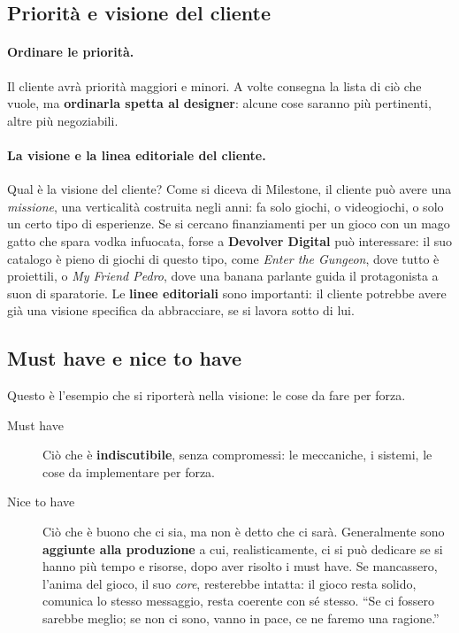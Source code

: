 \subsection{Priorità e visione del cliente}

\paragraph{Ordinare le priorità.} Il cliente avrà priorità maggiori e
minori. A volte consegna la lista di ciò che vuole, ma \textbf{ordinarla spetta
al designer}: alcune cose saranno più pertinenti, altre più negoziabili.

\paragraph{La visione e la linea editoriale del cliente.} Qual è la visione
del cliente? Come si diceva di Milestone, il cliente può avere una
\emph{missione}, una verticalità costruita negli anni: fa solo giochi, o
videogiochi, o solo un certo tipo di esperienze. Se si cercano finanziamenti
per un gioco con un mago gatto che spara vodka infuocata, forse a
\textbf{Devolver Digital} può interessare: il suo catalogo è pieno di giochi
di questo tipo, come \emph{Enter the Gungeon}, dove tutto è proiettili, o
\emph{My Friend Pedro}, dove una banana parlante guida il protagonista a
suon di sparatorie. Le \textbf{linee editoriali} sono importanti: il cliente
potrebbe avere già una visione specifica da abbracciare, se si lavora sotto di
lui.

\subsection{Must have e nice to have}

Questo è l'esempio che si riporterà nella visione: le cose da fare per forza.
\begin{description}
  \item[Must have] Ciò che è \textbf{indiscutibile}, senza compromessi: le
        meccaniche, i sistemi, le cose da implementare per forza.
  \item[Nice to have] Ciò che è buono che ci sia, ma non è detto che ci sarà.
        Generalmente sono \textbf{aggiunte alla produzione} a cui,
        realisticamente, ci si può dedicare se si hanno più tempo e risorse,
        dopo aver risolto i must have. Se mancassero, l'anima del gioco, il suo
        \emph{core}, resterebbe intatta: il gioco resta solido, comunica lo
        stesso messaggio, resta coerente con sé stesso. ``Se ci fossero
        sarebbe meglio; se non ci sono, vanno in pace, ce ne faremo una
        ragione.''
\end{description}


